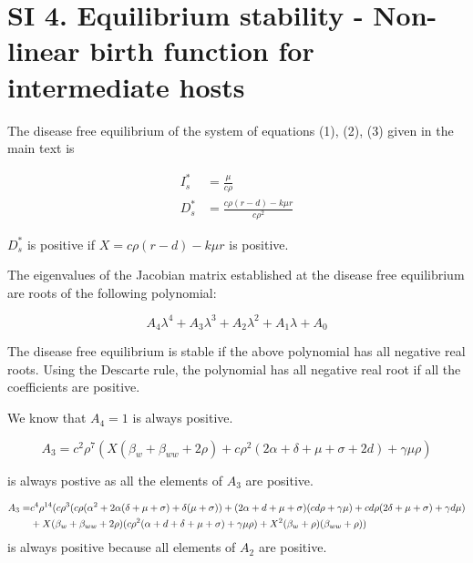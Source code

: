 \documentclass[11pt]{article}
\begin{document}
\section*{SI 4. Equilibrium stability - Non-linear birth function for intermediate hosts }
The disease free equilibrium of the system of equations (1), (2), (3) given in the main text is

\begin{align}
	I_s^* & = \frac{\mu}{c \rho} \\
	D_s^* & = \frac{c \rho  (r-d)-k \mu  r}{c \rho^2}
\end{align}

$D_s^*$ is positive if $X = c \rho  (r-d)-k \mu  r$ is positive.

The eigenvalues of the Jacobian matrix established at the disease free equilibrium are roots of the following polynomial:

\begin{equation}
	A_4 \lambda^4 + A_3 \lambda^3 + A_2 \lambda^2 + A_1 \lambda + A_0
\end{equation}

The disease free equilibrium is stable if the above polynomial has all negative real roots. Using the Descarte rule, the polynomial has all negative real root if all the coefficients are positive.

We know that $A_4 = 1$ is always positive. 

\begin{equation}
	A_3 = c^2 \rho ^7 (X (\beta_w + \beta_{ww}+2 \rho ) + c \rho^2  (2 \alpha +\delta +\mu +\sigma + 2 d  )+\gamma  \mu  \rho )
\end{equation}

is always postive as all the elements of $A_3$ are positive.

\begin{align}
	A_3 = & c^4 \rho^{14} (c \rho ^3 (c \rho  (\alpha ^2+2 \alpha  (\delta +\mu +\sigma )+\delta  (\mu +\sigma ))+(2 \alpha +d+\mu +\sigma ) (c d \rho +\gamma  \mu )+c d \rho  (2 \delta +\mu +\sigma )+\gamma  d \mu ) \notag \\
	&+X (\beta_w + \beta_{ww}+2 \rho ) (c \rho ^2 (\alpha +d+\delta +\mu +\sigma )+\gamma  \mu  \rho )+X^2 (\beta_w+\rho ) (\beta_{ww}+\rho ))
\end{align}
is always positive because all elements of $A_2$ are positive.
\end{document}
